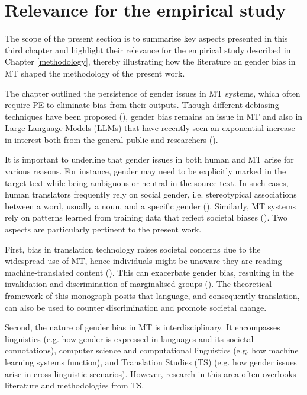 \section{Relevance for the empirical study}
The scope of the present section is to summarise key aspects presented in this third chapter and highlight their relevance for the empirical study described in Chapter \ref{methodology}, thereby illustrating how the literature on gender bias in MT shaped the methodology of the present work. 

The chapter outlined the persistence of gender issues in MT systems, which often require PE to eliminate bias from their outputs. Though different debiasing techniques have been proposed (\cite{vanmassenhove2019getting,saunders2020reducing,tomalin2021practical}), gender bias remains an issue in MT and also in Large Language Models (LLMs) that have recently seen an exponential increase in interest both from the general public and researchers (\cite{kotek2023gender}). 

It is important to underline that gender issues in both human and MT arise for various reasons. For instance, gender may need to be explicitly marked in the target text while being ambiguous or neutral in the source text. In such cases, human translators frequently rely on social gender, i.e. stereotypical associations between a word, usually a noun, and a specific gender (\cite{nissen2002aspects}). Similarly, MT systems rely on patterns learned from training data that reflect societal biases (\cite{forcada2017making}). Two aspects are particularly pertinent to the present work.

First, bias in translation technology raises societal concerns due to the widespread use of MT, hence individuals might be unaware they are reading machine-translated content (\cite{martindale2018fluency}). This can exacerbate gender bias, resulting in the invalidation and discrimination of marginalised groups (\cite{dev-etal-2021-harms}). The theoretical framework of this monograph posits that language, and consequently translation, can also be used to counter discrimination and promote societal change.

Second, the nature of gender bias in MT is interdisciplinary. It encompasses linguistics (e.g. how gender is expressed in languages and its societal connotations), computer science and computational linguistics (e.g. how machine learning systems function), and Translation Studies (TS) (e.g. how gender issues arise in cross-linguistic scenarios). However, research in this area often overlooks literature and methodologies from TS.

